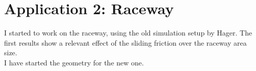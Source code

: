 
\section{Application 2: Raceway}
\label{sec:application2raceway}

I started to work on the raceway, using the old simulation setup by Hager.
The first results show a relevant effect of the sliding friction over the
raceway area size.\\
I have started the geometry for the new one.



